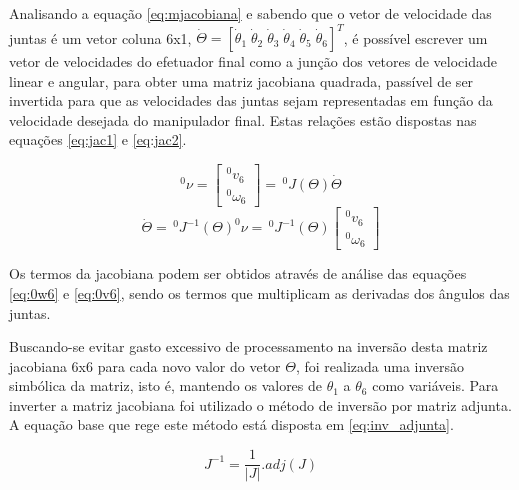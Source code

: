 Analisando a equação \ref{eq:mjacobiana} e sabendo que o vetor de velocidade das juntas
é um vetor coluna 6x1, $\dot{\Theta} = [\dot{\theta}_1 \; \dot{\theta}_2 \; \dot{\theta}_3 \; \dot{\theta}_4 \; \dot{\theta}_5 \; \dot{\theta}_6]^T$,
é possível escrever um vetor de velocidades do efetuador final como a junção dos vetores de velocidade linear
e angular, para obter uma matriz jacobiana quadrada, passível de ser invertida para que as velocidades das juntas
sejam representadas em função da velocidade desejada do manipulador final. Estas relações estão dispostas nas equações 
\ref{eq:jac1} e \ref{eq:jac2}.

\begin{multicols}{2}
    \noindent
    \begin{equation}
        \label{eq:jac1}
        ^0\nu = \begin{bmatrix}
                    ^0v_6 \\
                    ^0\omega_6
                \end{bmatrix}
              = \,^0\!J(\Theta)\dot{\Theta}
    \end{equation}
    \noindent
    \begin{equation}
        \label{eq:jac2}
        \dot{\Theta} = \,^0\!J^{-1}(\Theta)^0\nu = \,^0\!J^{-1}(\Theta)\begin{bmatrix}
                                                                            ^0v_6 \\
                                                                            ^0\omega_6
                                                                        \end{bmatrix}
    \end{equation}
\end{multicols}

Os termos da jacobiana podem ser obtidos através de análise das equações \ref{eq:0w6} e \ref{eq:0v6},
sendo os termos que multiplicam as derivadas dos ângulos das juntas.

Buscando-se evitar gasto excessivo de processamento na inversão desta matriz jacobiana 6x6 para cada
novo valor do vetor $\Theta$, foi realizada uma inversão simbólica da matriz, isto é, mantendo os 
valores de $\theta_1$ a $\theta_6$ como variáveis. Para inverter a matriz jacobiana foi utilizado o 
método de inversão por matriz adjunta. A equação base que rege este método está disposta em \ref{eq:inv_adjunta}.

\begin{equation}
    \label{eq:inv_adjunta}
    J^{-1}  = \frac{1}{|J|}.adj(J)
\end{equation}


